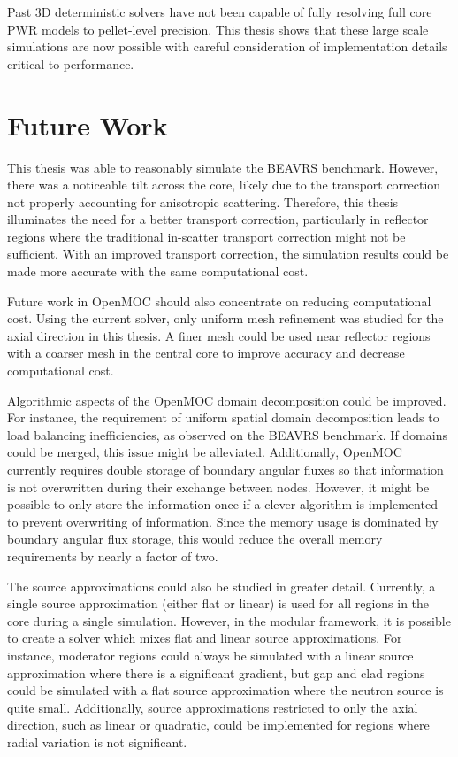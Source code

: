 \documentclass[12pt,twoside]{mitthesis-exec}
\begin{document}
Past 3D deterministic solvers have not been capable of fully resolving full core PWR models to pellet-level precision. This thesis shows that these large scale simulations are now possible with careful consideration of implementation details critical to performance.

\section*{Future Work}

This thesis was able to reasonably simulate the BEAVRS benchmark. However, there was a noticeable tilt across the core, likely due to the transport correction not properly accounting for anisotropic scattering. Therefore, this thesis illuminates the need for a better transport correction, particularly in reflector regions where the traditional in-scatter transport correction might not be sufficient. With an improved transport correction, the simulation results could be made more accurate with the same computational cost.

Future work in OpenMOC should also concentrate on reducing computational cost. Using the current solver, only uniform mesh refinement was studied for the axial direction in this thesis. A finer mesh could be used near reflector regions with a coarser mesh in the central core to improve accuracy and decrease computational cost.

Algorithmic aspects of the OpenMOC domain decomposition could be improved. For instance, the requirement of uniform spatial domain decomposition leads to load balancing inefficiencies, as observed on the BEAVRS benchmark. If domains could be merged, this issue might be alleviated. Additionally, OpenMOC currently requires double storage of boundary angular fluxes so that information is not overwritten during their exchange between nodes. However, it might be possible to only store the information once if a clever algorithm is implemented to prevent overwriting of information. Since the memory usage is dominated by boundary angular flux storage, this would reduce the overall memory requirements by nearly a factor of two.

The source approximations could also be studied in greater detail. Currently, a single source approximation (either flat or linear) is used for all regions in the core during a single simulation. However, in the modular framework, it is possible to create a solver which mixes flat and linear source approximations. For instance, moderator regions could always be simulated with a linear source approximation where there is a significant gradient, but gap and clad regions could be simulated with a flat source approximation where the neutron source is quite small. Additionally, source approximations restricted to only the axial direction, such as linear or quadratic, could be implemented for regions where radial variation is not significant.
\end{document}
